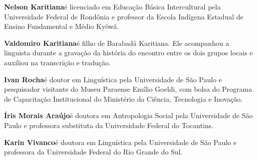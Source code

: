 \noindent \textbf{Nelson Karitiana}\quad é licenciado em Educação Básica Intercultural pela Universidade Federal de Rondônia e professor da Escola Indígena Estadual de Ensino Fundamental e Médio Kyõwã.\\
\vspace{-0.5em}

\noindent \textbf{Valdomiro Karitiana}\quad é filho de Barabadá Karitiana. Ele acompanhou a linguista durante a gravação da história do encontro entre os dois grupos locais e auxiliou na transcrição e tradução. 
\medskip

\noindent \textbf{Ivan Rocha}\quad é doutor em Linguística pela Universidade de São Paulo e
 pesquisador visitante do Museu Paraense Emílio Goeldi, com bolsa do
 Programa de Capacitação Institucional do Ministério da Ciência,
 Tecnologia e Inovação. %
\medskip

\noindent \textbf{Íris Morais Araújo}\quad é doutora em Antropologia Social pela Universidade de São Paulo e professora substituta da Universidade Federal do Tocantins.%
\medskip

\noindent \textbf{Karin Vivanco}\quad é doutora em Linguística pela Universidade de São Paulo e professora da Universidade Federal do Rio Grande do Sul.


